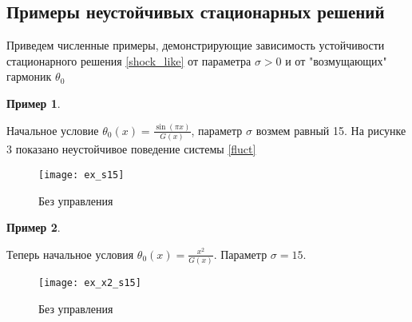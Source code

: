 \subsection{Примеры неустойчивых стационарных решений}

Приведем численные примеры, демонстрирующие зависимость устойчивости
стационарного решения \eqref{shock_like} от параметра $\sigma > 0$ и от
"возмущающих" гармоник $\theta_0$

\newtheorem{exmp_bur}{Пример}
\begin{exmp_bur}
\end{exmp_bur}

Начальное условие $\theta_0(x) = \frac{\sin(\pi x)}{G(x)}$, параметр $\sigma$ 
возмем равный 15. На рисунке 3 показано неустойчивое поведение системы
\eqref{fluct}

\begin{figure}[H]
    \centering
    \texttt{[image: ex\_s15]}
    \caption{Без управления}
\end{figure}

\begin{exmp_bur}
\end{exmp_bur}
Теперь начальное условия $\theta_0(x) = \frac{x^2}{G(x)}$. Параметр $\sigma = 15$. 

\begin{figure}[H]
    \centering
    \texttt{[image: ex\_x2\_s15]}
    \caption{Без управления}
\end{figure}
